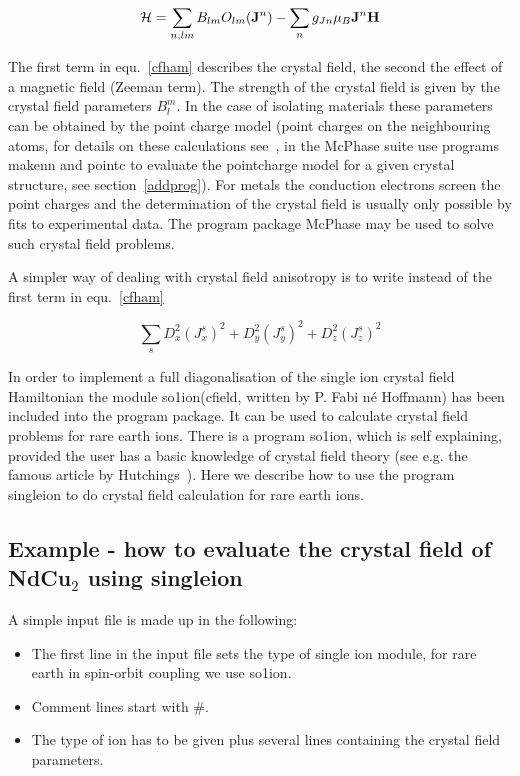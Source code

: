 \begin{equation}
\label{cfham}
 {\mathcal H}= \sum_{n,lm} B_{lm} O_{lm}({\mathbf J}^n) 
	     - \sum_{n} g_{Jn} \mu_B {\mathbf J}^n {\mathbf H} 
\end{equation}

The first term in equ.~\ref{cfham} describes the crystal field, the second the
effect of a magnetic field (Zeeman term). The strength of the crystal field is given by the
crystal field parameters $B_l^m$. In the case of isolating materials these
parameters can be obtained by the point charge model (point charges on the 
neighbouring atoms, for details on these calculations see~\cite{hutchings64-227},
in the {\prg McPhase} suite use programs {\prg makenn} and {\prg pointc} to evaluate
the pointcharge model for a given crystal structure, see section~\ref{addprog}).
For metals the conduction electrons screen the point charges and the determination
of the crystal field is usually only possible by fits to experimental data. 
The program package {\prg McPhase} may be used to solve such crystal field problems.

A simpler way of dealing with crystal field anisotropy is to write
instead of the first term in equ.~\ref{cfham}

\begin{equation}
  \sum_s D_x^2 (J_x^s)^2 + D_y^2 (J_y^s)^2 +D_z^2 (J_z^s)^2 
\end{equation}

In order to implement a full diagonalisation of the single ion crystal field Hamiltonian
the module {\prg so1ion}({\prg cfield}, written by P. Fabi n\'e Hoffmann) has %
been included into the program package. It  can be used  to 
calculate crystal field problems for rare earth ions. There is a program 
{\prg so1ion}, which is self explaining, provided 
the user has a basic knowledge of crystal field 
theory (see e.g. the famous article by Hutchings~\cite{hutchings64-227}).
Here we describe how to use the program {\prg singleion} to do crystal field calculation
for rare earth ions. 

\subsection{Example - how to evaluate the crystal field of NdCu$_2$ using
 {\prg singleion}}\label{cfieldexample}


A simple input file is made up in the following:

\begin{itemize}
\item The first line in the input file sets the type of single ion module, for rare earth in spin-orbit
    coupling we use {\prg so1ion}.
\item Comment lines start with \#. 
\item The type of ion has to be given plus
several lines containing the crystal field parameters. 
\end{itemize}

